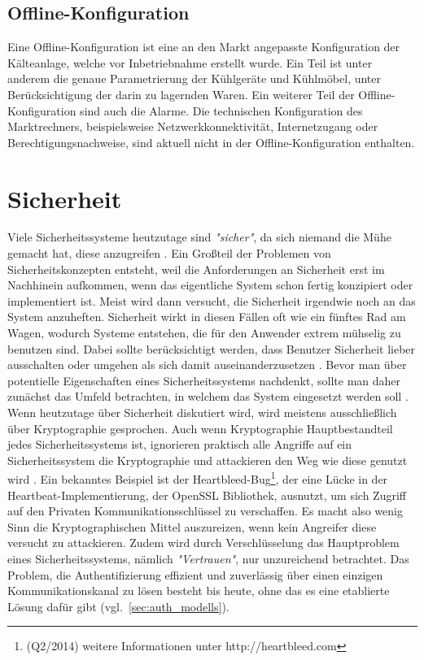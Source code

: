 \documentclass[11pt,a4paper]{report}
\begin{document}
\subsection{Offline-Konfiguration} 

Eine Offline-Konfiguration ist eine an den Markt angepasste Konfiguration der Kälteanlage, welche vor Inbetriebnahme erstellt wurde. Ein Teil ist unter anderem die genaue Parametrierung der Kühlgeräte und Kühlmöbel, unter Berücksichtigung der darin zu lagernden Waren. Ein weiterer Teil der Offline-Konfiguration sind auch die Alarme. Die technischen Konfiguration des Marktrechners, beispielsweise Netzwerkkonnektivität, Internetzugang oder Berechtigungsnachweise, sind aktuell nicht in der Offline-Konfiguration enthalten.

\section{Sicherheit} \label{sec:security_conzept}

Viele Sicherheitssysteme heutzutage sind \textit{"sicher"}, da sich niemand die Mühe gemacht hat, diese anzugreifen \cite[s.~0]{gutmann}. Ein Großteil der Problemen von Sicherheitskonzepten entsteht, weil die Anforderungen an Sicherheit erst im Nachhinein aufkommen, wenn das eigentliche System schon fertig konzipiert oder implementiert ist. Meist wird dann versucht, die Sicherheit irgendwie noch an das System anzuheften. Sicherheit wirkt in diesen Fällen oft wie ein fünftes Rad am Wagen, wodurch Systeme entstehen, die für den Anwender extrem mühselig zu benutzen sind. Dabei sollte berücksichtigt werden, dass Benutzer Sicherheit lieber ausschalten oder umgehen als sich damit auseinanderzusetzen \cite[s.~5]{gutmann}. Bevor man über potentielle Eigenschaften eines Sicherheitssystems nachdenkt, sollte man daher zunächst das Umfeld betrachten, in welchem das System eingesetzt werden soll \cite[s.~4]{gutmann}. Wenn heutzutage über Sicherheit diskutiert wird, wird meistens ausschließlich über Kryptographie gesprochen. Auch wenn Kryptographie Hauptbestandteil jedes Sicherheitssystems ist, ignorieren praktisch alle Angriffe auf ein Sicherheitssystem die Kryptographie und attackieren den Weg wie diese genutzt wird \cite[s.~1]{gutmann}. Ein bekanntes Beispiel ist der Heartbleed-Bug\footnote{(Q2/2014) weitere Informationen unter http://heartbleed.com}, der eine Lücke in der Heartbeat-Implementierung, der OpenSSL Bibliothek, ausnutzt, um sich Zugriff auf den Privaten Kommunikationsschlüssel zu verschaffen. Es macht also wenig Sinn die Kryptographischen Mittel auszureizen, wenn kein Angreifer diese versucht zu attackieren. Zudem wird durch Verschlüsselung das Hauptproblem eines Sicherheitssystems, nämlich \textit{"Vertrauen"}, nur unzureichend betrachtet. Das Problem, die Authentifizierung effizient und zuverlässig über einen einzigen Kommunikationskanal zu lösen besteht bis heute, ohne das es eine etablierte Lösung dafür gibt (vgl.~\ref{sec:auth_modells}). 
\end{document}
